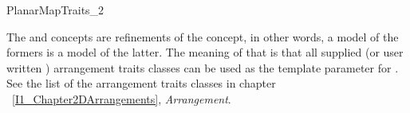 \begin{ccRefConcept}{PlanarMapTraits_2}

\ccHasModels

The  and
 concepts are refinements of the
 concept, in other words, a model of the
formers is a model of the latter.  The meaning of that is that all
supplied (or user written ) arrangement traits classes can be used
as the  template parameter for
.  See the list of the arrangement
traits classes in chapter ~\ref{I1_Chapter2DArrangements},
{\em Arrangement}.
  
\end{ccRefConcept} %

\ccRefPageEnd
